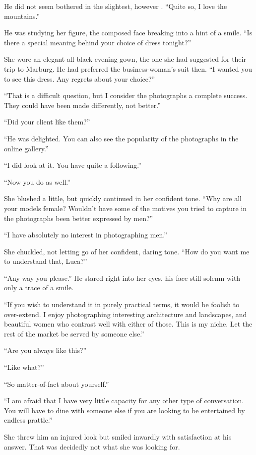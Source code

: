 He did not seem bothered in the slightest, however . ``Quite so, I love the mountains.''

He was studying her figure, the composed face breaking into a hint of a smile. ``Is there a special meaning behind your choice of dress tonight?''

She wore an elegant all-black evening gown, the one she had suggested for their trip to Marburg. He had preferred the business-woman's suit then. ``I wanted you to see this dress. Any regrets about your choice?''

``That is a difficult question, but I consider the photographs a complete success. They could have been made differently, not better.''

``Did your client like them?''

``He was delighted. You can also see the popularity of the photographs in the online gallery.''

``I did look at it. You have quite a following.''

``Now you do as well.''

She blushed a little, but quickly continued in her confident tone. ``Why are all your models female? Wouldn't have some of the motives you tried to capture in the photographs been better expressed by men?''

``I have absolutely no interest in photographing men.''

She chuckled, not letting go of her confident, daring tone. ``How do you want me to understand that, Luca?''

``Any way you please.'' He stared right into her eyes, his face still solemn with only a trace of a smile.

``If you wish to understand it in purely practical terms, it would be foolish to over-extend. I enjoy photographing interesting architecture and landscapes, and beautiful women who contrast well with either of those. This is my niche. Let the rest of the market be served by someone else.''

``Are you always like this?''

``Like what?''

``So matter-of-fact about yourself.''

``I am afraid that I have very little capacity for any other type of conversation. You will have to dine with someone else if you are looking to be entertained by endless prattle.''

She threw him an injured look but smiled inwardly with satisfaction at his answer. That was decidedly not what she was looking for.

